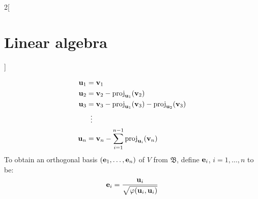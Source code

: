 \documentclass[../../../main.tex]{subfiles}
\begin{document}
\begin{multicols}{2}[\section{Linear algebra}]
\begin{method}
        \begin{align*}
            \boldsymbol{\mathrm{u}}_1 & =\boldsymbol{\mathrm{v}}_1                                                                                                                   \\
            \boldsymbol{\mathrm{u}}_2 & =\boldsymbol{\mathrm{v}}_2-\text{proj}_{\boldsymbol{\mathrm{u}}_1}(\boldsymbol{\mathrm{v}}_2)                                                          \\
            \boldsymbol{\mathrm{u}}_3 & =\boldsymbol{\mathrm{v}}_3-\text{proj}_{\boldsymbol{\mathrm{u}}_1}(\boldsymbol{\mathrm{v}}_3)-\text{proj}_{\boldsymbol{\mathrm{u}}_2}(\boldsymbol{\mathrm{v}}_3) \\
                                 & \;\;\vdots                                                                                                                              \\
            \boldsymbol{\mathrm{u}}_n & =\boldsymbol{\mathrm{v}}_n-\sum_{i=1}^{n-1}\text{proj}_{\boldsymbol{\mathrm{u}}_i}(\boldsymbol{\mathrm{v}}_n)
        \end{align*}
        To obtain an orthogonal basis $(\boldsymbol{\mathrm{e}}_1,\ldots,\boldsymbol{\mathrm{e}}_n)$ of $V$ from $\mathfrak{B}$, define $\boldsymbol{\mathrm{e}}_i$, $i=1,\ldots,n$ to be: $$\boldsymbol{\mathrm{e}}_i=\frac{\boldsymbol{\mathrm{u}}_i}{\sqrt{\varphi(\boldsymbol{\mathrm{u}}_i,\boldsymbol{\mathrm{u}}_i)}}$$
    \end{method}

\end{multicols}
\end{document}
